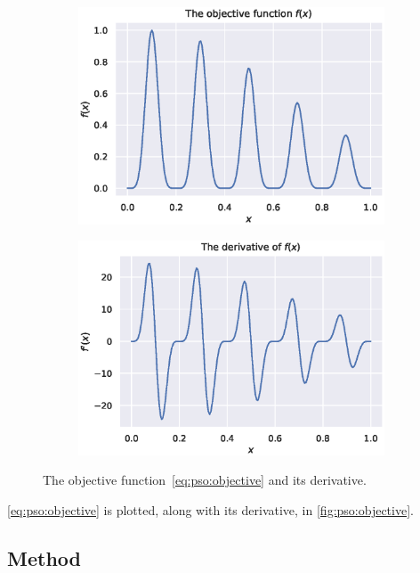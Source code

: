 \documentclass[12pt]{article}
\begin{document}
\begin{figure}
    \centering
    \begin{subfigure}[b]{0.49\textwidth}
        \centering
        \includegraphics[width=\textwidth]{figures/pso/prob1-function.eps}
    \end{subfigure}
    \begin{subfigure}[b]{0.49\textwidth}
        \centering
        \includegraphics[width=\textwidth]{figures/pso/prob1-derivative.eps}
    \end{subfigure}
    \caption{The objective function~\ref{eq:pso:objective} and its derivative.}\label{fig:pso:objective}
\end{figure}
\autoref{eq:pso:objective} is plotted, along with its derivative, in \autoref{fig:pso:objective}.

\subsection{Method}
\end{document}
